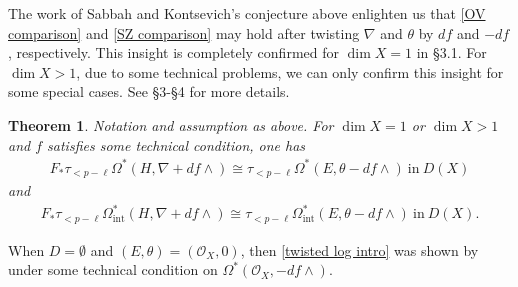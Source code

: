 \documentclass[12pt, a4paper]{article}
\newtheorem{theorem}{Theorem}[section]
\begin{document}
The work of Sabbah \cite{Sah1} and Kontsevich's conjecture above enlighten us that \eqref{OV comparison} and \eqref{SZ comparison} may hold after twisting $\nabla$ and $\theta$ by $df$ and $-df$, respectively. This insight is completely confirmed for $\dim X=1$ in \S3.1. For $\dim X>1$, due to some technical problems, we can only confirm this insight for some special cases.  See \S3-\S4 for more details.
\begin{theorem}\label{Main theorem A intro}
Notation and assumption as above. For $\dim X=1$ or $\dim X>1$ and $f$ satisfies some technical condition, one has
\begin{eqnarray}\label{twisted log intro}
F_*\tau_{<p-\ell}\Omega^*(H,\nabla+df\wedge)\cong\tau_{<p-\ell}\Omega^*(E,\theta-df\wedge)~\mathrm{in}~D(X)
\end{eqnarray}
and
\begin{eqnarray}\label{twisted int intro}
F_*\tau_{<p-\ell}\Omega_\mathrm{int}^*(H,\nabla+df\wedge)\cong\tau_{<p-\ell}\Omega_\mathrm{int}^*(E,\theta-df\wedge)~\mathrm{in}~D(X).
\end{eqnarray}
\end{theorem}
When $D=\emptyset$ and $(E,\theta)=(\mathcal O_X,0)$, then \eqref{twisted log intro} was shown by \cite[Theorem 4.23 (2)]{OV} under some technical condition on $\Omega^*(\mathcal O_X,-df\wedge)$.
\end{document}
